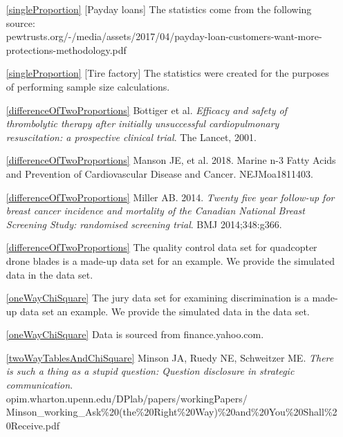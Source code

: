\begin{itemize}
\item[\ref{singleProportion}]
    [Payday loans]
    The statistics come from the following source: \\
    {\small{}
        {pewtrusts.org/-/media/assets/2017/04/payday-loan-customers-want-more-protections-methodology.pdf}}
\item[\ref{singleProportion}]
    [Tire factory]
    The statistics were created for the purposes
    of performing sample size calculations.

\item[\ref{differenceOfTwoProportions}]
    B$\ddot{\text{o}}$ttiger et al.
    \emph{Efficacy and safety of thrombolytic therapy after
        initially unsuccessful cardiopulmonary resuscitation:
        a prospective clinical trial}.
        The Lancet, 2001.
\item[\ref{differenceOfTwoProportions}]
    Manson JE, et al. 2018.
    Marine n-3 Fatty Acids and Prevention of
    Cardiovascular Disease and Cancer. NEJMoa1811403.
\item[\ref{differenceOfTwoProportions}]
        {Miller AB. 2014.
            \emph{Twenty five year follow-up for breast cancer
            incidence and mortality of the Canadian National
            Breast Screening Study: randomised screening trial}.
            BMJ 2014;348:g366.}
\item[\ref{differenceOfTwoProportions}]
    The quality control data set for quadcopter drone blades
    is a made-up data set for an example.
    We provide the simulated data in the
     data set.

\item[\ref{oneWayChiSquare}]
    The jury data set for examining discrimination
    is a made-up data set an example.
    We provide the simulated data in the  data set.
\item[\ref{oneWayChiSquare}]
    Data is sourced from
        {finance.yahoo.com}.

\item[\ref{twoWayTablesAndChiSquare}]
    Minson JA, Ruedy NE, Schweitzer ME.
    \emph{There is such a thing as a stupid question:
    Question disclosure in strategic communication}. \\
    {\small{}
        {opim.wharton.upenn.edu/DPlab/papers/workingPapers/}}\\
    {\small{}
        {Minson\_working\_Ask\%20(the\%20Right\%20Way)\%20and\%20You\%20Shall\%20Receive.pdf}}


\end{itemize}
